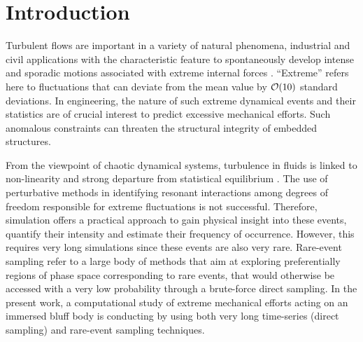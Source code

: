 \documentclass[pre,aps,floatfix,10pt,superscriptaddress, notitlepage,preprint]{revtex4-1}
\begin{document}
\maketitle
	
\section{Introduction}
	
%
Turbulent flows are important in a variety of natural phenomena, industrial and civil applications with the characteristic feature to spontaneously develop intense and sporadic motions associated with extreme internal forces \cite{lesieur_book,donzis_sreenivasan_2010,Yeung}.
``Extreme'' refers here to fluctuations that can deviate from the mean value by ${\cal{O}}(10)$ standard deviations.
In engineering, the nature of such extreme dynamical events and their statistics are of crucial interest to predict excessive mechanical efforts.
Such anomalous constraints can threaten the structural integrity of embedded structures.
%

From the viewpoint of chaotic dynamical systems, turbulence in fluids is linked to non-linearity and strong departure from statistical equilibrium \cite{KRAICHNAN}.
The use of perturbative methods in identifying resonant interactions among degrees of freedom responsible for extreme fluctuations is not successful.
Therefore, simulation offers a practical approach to gain physical insight into these events, quantify their intensity and estimate their frequency of occurrence.
However, this requires very long simulations since these events are also very rare.
%
{Rare-event sampling refer to a large body of methods that aim at exploring preferentially regions of phase space corresponding to rare events, that would otherwise be accessed with a very low probability through a brute-force direct sampling.}
%
In the present work, a computational study of extreme mechanical efforts acting on an immersed bluff body is conducting by using both very long time-series (direct sampling) and rare-event sampling techniques.
%	
	
\end{document}
